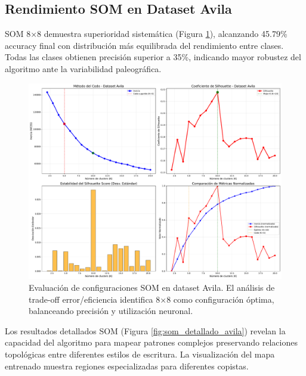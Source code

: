 \documentclass[12pt,a4paper]{article}
\begin{document}
\subsection{Rendimiento SOM en Dataset Avila}

SOM 8×8 demuestra superioridad sistemática (Figura \ref{fig:som_avila}), alcanzando 45.79\% accuracy final con distribución más equilibrada del rendimiento entre clases. Todas las clases obtienen precisión superior a 35\%, indicando mayor robustez del algoritmo ante la variabilidad paleográfica.

\begin{figure}[H]
    \centering
    \includegraphics[width=\textwidth]{figures/figura_10_analisis_som_avila.pdf}
    \caption{Evaluación de configuraciones SOM en dataset Avila. El análisis de trade-off error/eficiencia identifica 8×8 como configuración óptima, balanceando precisión y utilización neuronal.}
    \label{fig:som_avila}
\end{figure}

Los resultados detallados SOM (Figura \ref{fig:som_detallado_avila}) revelan la capacidad del algoritmo para mapear patrones complejos preservando relaciones topológicas entre diferentes estilos de escritura. La visualización del mapa entrenado muestra regiones especializadas para diferentes copistas.
\end{document}
